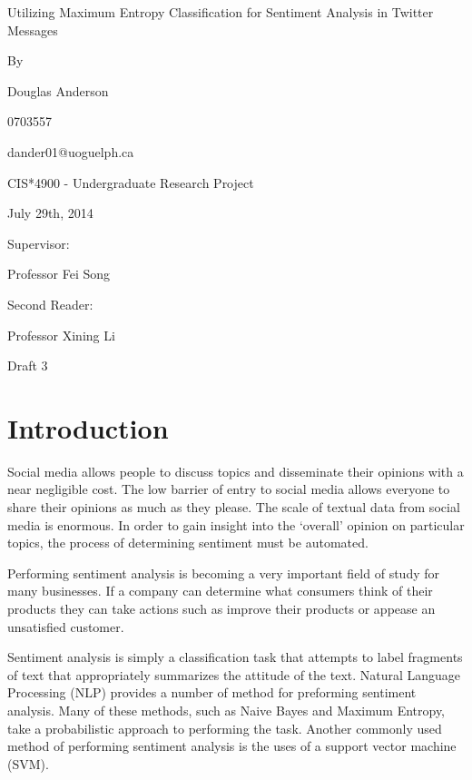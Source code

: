 \documentclass[final,3p,12pt]{elsarticle}
\begin{document}
\thispagestyle{empty}
\begin{center}

\huge

Utilizing Maximum Entropy Classification for Sentiment Analysis in Twitter Messages

\large
\vspace{2.0cm}
By

\vspace{1.0cm}
Douglas Anderson

0703557

dander01@uoguelph.ca

\vspace{1.5cm}
CIS*4900 - Undergraduate Research Project

July 29th, 2014 %

\vspace{1.5cm}

Supervisor:

Professor Fei Song

\vspace{1.5cm}

Second Reader:

Professor Xining Li

\vspace{1.5cm}

Draft 3 %

\end{center}

\newpage
\setcounter{page}{1}

\section{Introduction}

Social media allows people to discuss topics and disseminate their opinions
with a near negligible cost. The low barrier of entry to social media allows
everyone to share their opinions as much as they please. The scale of textual
data from social media is enormous. In order to gain insight into the `overall'
opinion on particular topics, the process of determining sentiment must be
automated.

Performing sentiment analysis is becoming a very important field of study for
many businesses. If a company can determine what consumers think of their
products they can take actions such as improve their products or appease an
unsatisfied customer.

Sentiment analysis is simply a classification task that attempts to label
fragments of text that appropriately summarizes the attitude of the text.
Natural Language Processing (NLP) provides a number of method for preforming
sentiment analysis. Many of these methods, such as Naive Bayes and Maximum
Entropy, take a probabilistic approach to performing the task. Another commonly
used method of performing sentiment analysis is the uses of a support vector
machine (SVM).
\end{document}
